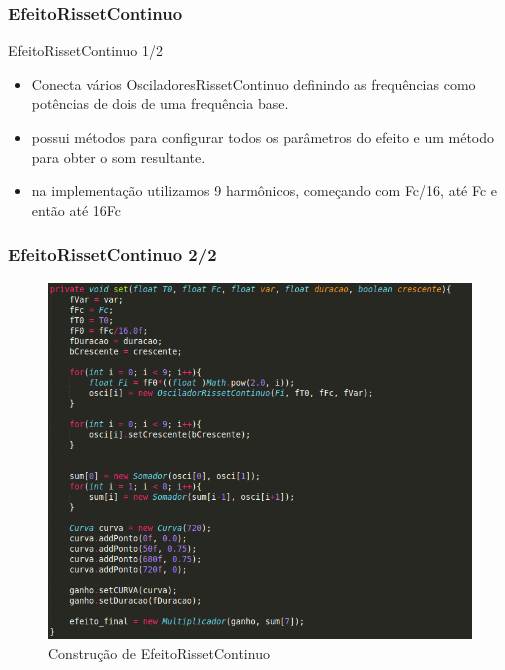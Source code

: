 \documentclass{beamer}
\begin{document}
\subsubsection{EfeitoRissetContinuo}
\begin{frame}{EfeitoRissetContinuo 1/2}
\begin{itemize}
	\item Conecta vários OsciladoresRissetContinuo definindo as frequências
	como potências de dois de uma frequência base.
	\item possui métodos para configurar todos os parâmetros do efeito
	e um método para obter o som resultante.
	\item na implementação utilizamos 9 harmônicos, começando com Fc/16,
	até Fc e então até 16Fc
\end{itemize}
\end{frame}

\begin{frame}
 \frametitle{EfeitoRissetContinuo 2/2}
 \begin{figure}
  \includegraphics[scale=0.6]{./images/efeitoRisset_code.png}
  \caption{Construção de EfeitoRissetContinuo}
   \end{figure}
\end{frame}
\end{document}
